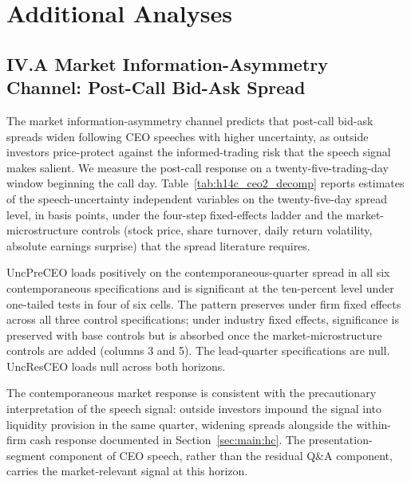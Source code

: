 
\section{Additional Analyses}
\label{sec:additional}

\subsection*{IV.A Market Information-Asymmetry Channel: Post-Call Bid-Ask Spread}
\label{sec:additional:spread}

The market information-asymmetry channel predicts that post-call bid-ask spreads widen following CEO speeches with higher uncertainty, as outside investors price-protect against the informed-trading risk that the speech signal makes salient. We measure the post-call response on a twenty-five-trading-day window beginning the call day. Table~\ref{tab:h14c_ceo2_decomp} reports estimates of the speech-uncertainty independent variables on the twenty-five-day spread level, in basis points, under the four-step fixed-effects ladder and the market-microstructure controls (stock price, share turnover, daily return volatility, absolute earnings surprise) that the spread literature requires.

UncPreCEO loads positively on the contemporaneous-quarter spread in all six contemporaneous specifications and is significant at the ten-percent level under one-tailed tests in four of six cells. The pattern preserves under firm fixed effects across all three control specifications; under industry fixed effects, significance is preserved with base controls but is absorbed once the market-microstructure controls are added (columns 3 and 5). The lead-quarter specifications are null. UncResCEO loads null across both horizons.

The contemporaneous market response is consistent with the precautionary interpretation of the speech signal: outside investors impound the signal into liquidity provision in the same quarter, widening spreads alongside the within-firm cash response documented in Section~\ref{sec:main:hc}. The presentation-segment component of CEO speech, rather than the residual Q\&A component, carries the market-relevant signal at this horizon.

